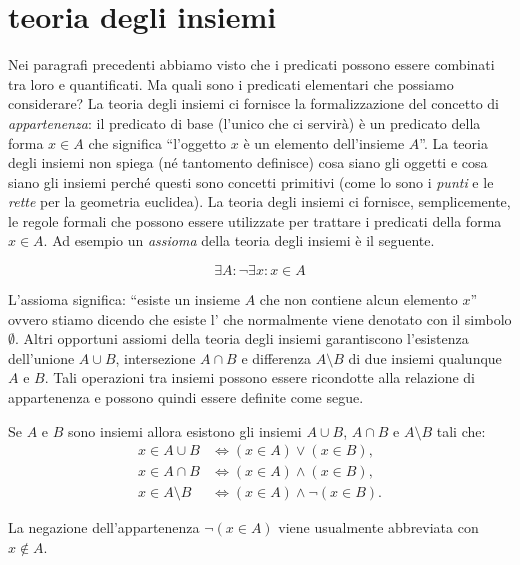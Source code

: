 \section{teoria degli insiemi}

Nei paragrafi precedenti abbiamo visto che i predicati possono essere
combinati tra loro e quantificati.
Ma quali sono i predicati elementari che possiamo considerare?
La teoria degli insiemi ci fornisce la formalizzazione del concetto
di \emph{appartenenza}: il predicato di base (l'unico che ci servirà) è
un predicato della forma $x \in A$ che significa ``l'oggetto $x$ è un elemento
dell'insieme $A$''.
La teoria degli insiemi non spiega (né tantomento definisce)
cosa siano gli oggetti e cosa siano gli insiemi perché questi sono concetti
primitivi (come lo sono i \emph{punti} e le \emph{rette} per la geometria euclidea).
La teoria degli insiemi ci fornisce, semplicemente, le regole formali che
possono essere utilizzate per trattare i predicati della forma $x\in A$.
Ad esempio un \emph{assioma} della teoria degli insiemi è il seguente.
\begin{axiom}
\[
  \exists A \colon \lnot \exists x\colon x \in A
\]
\end{axiom}
L'assioma significa: ``esiste un insieme $A$ che non contiene alcun elemento $x$''
ovvero stiamo dicendo che esiste l' che normalmente viene
denotato con il simbolo $\emptyset$.
Altri opportuni assiomi della teoria degli insiemi garantiscono l'esistenza
dell'unione $A\cup B$, intersezione $A\cap B$ e differenza $A\setminus B$
di due insiemi qualunque $A$ e $B$. Tali operazioni
tra insiemi possono essere ricondotte alla relazione di appartenenza
e possono quindi essere definite come segue.
\begin{axiom}
Se $A$ e $B$ sono insiemi allora esistono gli insiemi  
$A\cup B$, $A\cap B$ e $A\setminus B$ tali che:
\begin{align*}
    x \in A \cup B &\iff (x\in A) \lor (x\in B),\\
    x \in A \cap B &\iff (x\in A) \land (x\in B),\\
    x \in A \setminus B &\iff (x\in A) \land \lnot (x \in B).
\end{align*}
\end{axiom}

La negazione dell'appartenenza $\lnot (x \in A)$ viene usualmente
abbreviata con $x \not \in A$.

